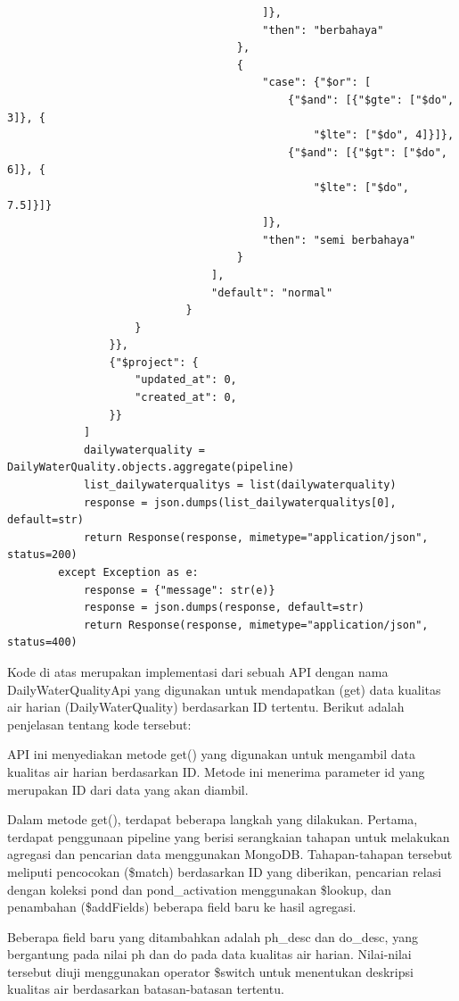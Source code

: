 \begin{enumerate}[1.]
\begin{lstlisting}
                                        ]},
                                        "then": "berbahaya"
                                    },
                                    {
                                        "case": {"$or": [
                                            {"$and": [{"$gte": ["$do", 3]}, {
                                                "$lte": ["$do", 4]}]},
                                            {"$and": [{"$gt": ["$do", 6]}, {
                                                "$lte": ["$do", 7.5]}]}
                                        ]},
                                        "then": "semi berbahaya"
                                    }
                                ],
                                "default": "normal"
                            }
                    }
                }},
                {"$project": {
                    "updated_at": 0,
                    "created_at": 0,
                }}
            ]
            dailywaterquality = DailyWaterQuality.objects.aggregate(pipeline)
            list_dailywaterqualitys = list(dailywaterquality)
            response = json.dumps(list_dailywaterqualitys[0], default=str)
            return Response(response, mimetype="application/json", status=200)
        except Exception as e:
            response = {"message": str(e)}
            response = json.dumps(response, default=str)
            return Response(response, mimetype="application/json", status=400)
\end{lstlisting}


Kode di atas merupakan implementasi dari sebuah API dengan nama DailyWaterQualityApi yang digunakan untuk mendapatkan (get) data kualitas air harian (DailyWaterQuality) berdasarkan ID tertentu. Berikut adalah penjelasan tentang kode tersebut:

API ini menyediakan metode get() yang digunakan untuk mengambil data kualitas air harian berdasarkan ID. Metode ini menerima parameter id yang merupakan ID dari data yang akan diambil.

Dalam metode get(), terdapat beberapa langkah yang dilakukan. Pertama, terdapat penggunaan pipeline yang berisi serangkaian tahapan untuk melakukan agregasi dan pencarian data menggunakan MongoDB. Tahapan-tahapan tersebut meliputi pencocokan (\$match) berdasarkan ID yang diberikan, pencarian relasi dengan koleksi pond dan pond\_activation menggunakan \$lookup, dan penambahan (\$addFields) beberapa field baru ke hasil agregasi.

Beberapa field baru yang ditambahkan adalah ph\_desc dan do\_desc, yang bergantung pada nilai ph dan do pada data kualitas air harian. Nilai-nilai tersebut diuji menggunakan operator \$switch untuk menentukan deskripsi kualitas air berdasarkan batasan-batasan tertentu.


\end{enumerate}

